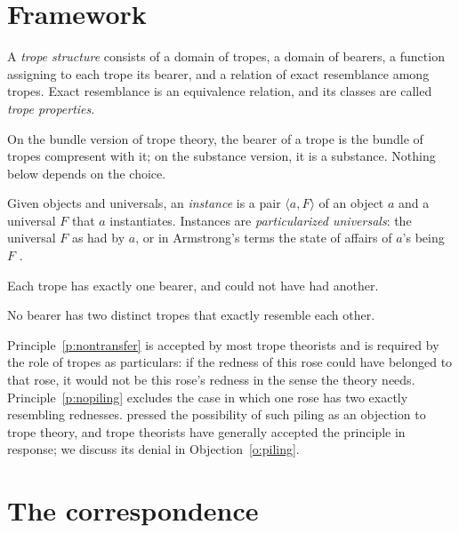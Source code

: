 \documentclass{situationist-preprint}
\begin{document}
\section{Framework}

\begin{definition}\label{d:trope}
A \emph{trope structure} consists of a domain of tropes, a domain of bearers, a function assigning to each trope its bearer, and a relation of exact resemblance among tropes. Exact resemblance is an equivalence relation, and its classes are called \emph{trope properties}.
\end{definition}

On the bundle version of trope theory, the bearer of a trope is the bundle of tropes compresent with it; on the substance version, it is a substance. Nothing below depends on the choice.

\begin{definition}\label{d:instance}
Given objects and universals, an \emph{instance} is a pair $\langle a, F\rangle$ of an object $a$ and a universal $F$ that $a$ instantiates. Instances are \emph{particularized universals}: the universal $F$ as had by $a$, or in Armstrong's terms the state of affairs of $a$'s being $F$ \citep{Armstrong1997}.
\end{definition}

\begin{principle}\label{p:nontransfer}
Each trope has exactly one bearer, and could not have had another.
\end{principle}

\begin{principle}[No piling]\label{p:nopiling}
No bearer has two distinct tropes that exactly resemble each other.
\end{principle}

Principle~\ref{p:nontransfer} is accepted by most trope theorists and is required by the role of tropes as particulars: if the redness of this rose could have belonged to that rose, it would not be this rose's redness in the sense the theory needs. Principle~\ref{p:nopiling} excludes the case in which one rose has two exactly resembling rednesses. \citet{Armstrong1989} pressed the possibility of such piling as an objection to trope theory, and trope theorists have generally accepted the principle in response; we discuss its denial in Objection~\ref{o:piling}.

\section{The correspondence}
\end{document}
